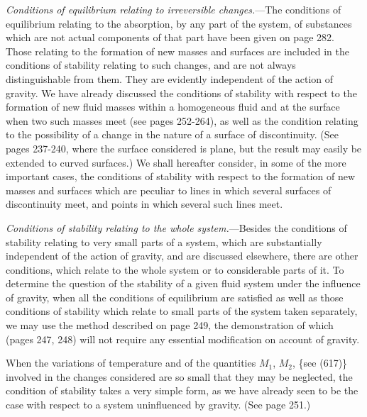 \documentclass[12pt]{memoir}
\begin{document}
\textit{Conditions of equilibrium  relating to irreversible changes.}---The
conditions of equilibrium relating to the absorption, by any part of the system, of substances which are not actual components of that part have been given on page 282. Those relating to the formation of new masses and surfaces are included in the conditions of stability relating to such changes, and are not always distinguishable from them. They are evidently independent of the action of gravity. We have already discussed the conditions of stability with respect to the formation of new fluid masses within a homogeneous fluid and at the surface when two such masses meet (see pages 252-264), as well as the condition relating to the possibility of a change in the nature of a surface of discontinuity. (See pages 237-240, where the surface considered is plane, but the result may easily be extended to curved surfaces.) We shall hereafter consider, in some of the more important cases, the conditions of stability with respect to the formation of new masses and surfaces which are peculiar to lines in which several surfaces of discontinuity meet, and points in which several such lines meet.

\textit{Conditions of stability relating to the whole system.}---Besides the conditions of stability relating to very small parts of a system, which are substantially independent of the action of gravity, and are discussed elsewhere, there are other conditions, which relate to the whole system or to considerable parts of it. To determine the question of the stability of a given fluid system under the influence of gravity, when all the conditions of equilibrium are satisfied as well as those conditions of stability which relate to small parts of the system taken separately, we may use the method described on page 249, the demonstration of which (pages 247, 248) will not require any essential modification on account of gravity.

When the variations of temperature and of the quantities $M_1$, $M_2$,  \{see (617)\} involved in the changes considered are so small that they may be neglected, the condition of stability takes a very simple form, as we have already seen to be the case with respect to a system uninfluenced by gravity. (See page 251.)
\end{document}
